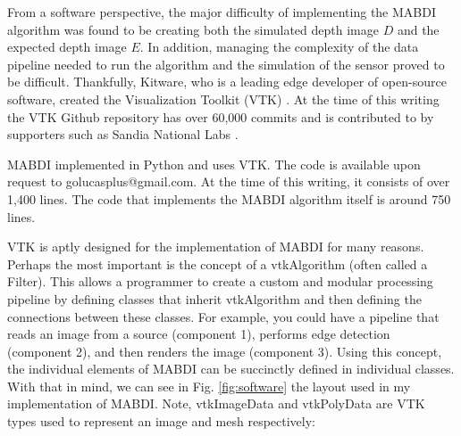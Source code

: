 From a software perspective, the major difficulty of implementing the MABDI
algorithm was found to be creating both the simulated depth image $D$ and the
expected depth image $E$. In addition, managing the complexity of the data
pipeline needed to run the algorithm and the simulation of the sensor proved to
be difficult. Thankfully, Kitware, who is a leading
edge developer of open-source software, created the Visualization Toolkit (VTK)
\cite{schroeder2004visualization, sitevtk}. At the time of this writing the VTK
Github repository has over 60,000 commits and is contributed to by supporters
such as Sandia National Labs \cite{sitesandia}.

MABDI implemented in Python and uses VTK. The code is available upon request to
golucasplus@gmail.com. At the time of this writing, it consists of over 1,400
lines. The code that implements the MABDI algorithm itself is around 750 lines.

VTK is aptly designed for the implementation of MABDI for many reasons. Perhaps
the most important is the concept of a vtkAlgorithm (often called a Filter).
This allows a programmer to create a custom and modular processing pipeline by
defining classes that inherit vtkAlgorithm and then defining the connections
between these classes. For example, you could have a pipeline that reads an
image from a source (component 1), performs edge detection (component 2), and
then renders the image (component 3). Using this concept, the individual
elements of MABDI can be succinctly defined in individual classes. With that in
mind, we can see in Fig. \ref{fig:software} the layout used in my implementation
of MABDI. Note, vtkImageData and vtkPolyData are VTK types used to represent an
image and mesh respectively:

